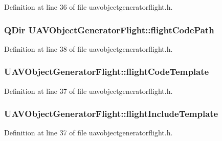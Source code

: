 Definition at line 36 of file uavobjectgeneratorflight.\-h.

\hypertarget{class_u_a_v_object_generator_flight_a80c1a0b70c1e4e9715328aa30ecea842}{
\subsubsection[{flight\-Code\-Path}]{\setlength{\rightskip}{0pt plus 5cm}Q\-Dir U\-A\-V\-Object\-Generator\-Flight\-::flight\-Code\-Path}}\label{class_u_a_v_object_generator_flight_a80c1a0b70c1e4e9715328aa30ecea842}


Definition at line 38 of file uavobjectgeneratorflight.\-h.

\hypertarget{class_u_a_v_object_generator_flight_a22a87ad4e972a2b9dcd67a08ba7d68cb}{
\subsubsection[{flight\-Code\-Template}]{ U\-A\-V\-Object\-Generator\-Flight\-::flight\-Code\-Template}}\label{class_u_a_v_object_generator_flight_a22a87ad4e972a2b9dcd67a08ba7d68cb}


Definition at line 37 of file uavobjectgeneratorflight.\-h.

\hypertarget{class_u_a_v_object_generator_flight_a7503ec01fd020de32a3eb7039be6dd41}{
\subsubsection[{flight\-Include\-Template}]{ U\-A\-V\-Object\-Generator\-Flight\-::flight\-Include\-Template}}\label{class_u_a_v_object_generator_flight_a7503ec01fd020de32a3eb7039be6dd41}


Definition at line 37 of file uavobjectgeneratorflight.\-h.

